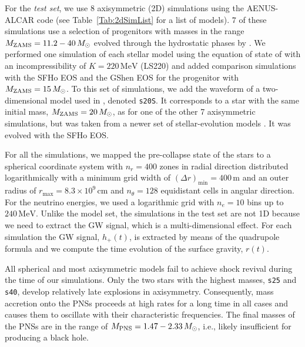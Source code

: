  
{For the {\it test set}, we use $8$ axisymmetric (2D) simulations using the {\sc AENUS-ALCAR} code
(see Table~\ref{Tab:2dSimList} for a list of models).
$7$ of these simulations use a selection of progenitors with masses in the range} $M_{\mathrm{ZAMS}} = 11.2 - 40 \, M_{\odot}$
 evolved through the hydrostatic phases by
\cite{Woosley_Heger_Weaver__2002__ReviewsofModernPhysics__The_evolution_and_explosion_of_massive_stars}.
We performed one simulation of each stellar model using the equation
of state of \cite{Lattimer_Swesty__1991__NuclearPhysicsA__LS-EOS} with
an incompressibility of $K = 220 \, \mathrm{MeV}$ (LS220) and added
comparison simulations with the SFHo EOS
\cite{Steiner_et_al__2013__apj__Core-collapseSupernovaEquationsofStateBasedonNeutronStarObservations}
and the GShen EOS 
\cite{Shen_et_al__2011__prc__Newequationofstateforastrophysicalsimulations}
for the {progenitor} with $M_{\mathrm{ZAMS}} = 15 \, M_{\odot}$. To this set of
simulations, we add the waveform of a two-dimensional model used in
\cite{Torres:2019a}, denoted \texttt{s20S}. It corresponds to a star
with the same initial mass, $M_{\mathrm{ZAMS}} = 20 \, M_{\odot}$, as for
one of the other 7 axisymmetric simulations, but was taken from a
newer set of stellar-evolution models
\cite{Woosley_Heger__2007__physrep__Nucleosynthesisandremnantsinmassivestarsofsolarmetallicity}.
It was evolved with the SFHo EOS.


{For all the simulations,} we mapped the pre-collapse state of the stars to a spherical
coordinate system with $n_r = 400$ zones in radial direction
distributed logarithmically with a minimum grid width of
$(\Delta r)_{\mathrm{min}} = 400 \, \mathrm{m}$ and an outer radius of
$r_{\mathrm{max}} = 8.3 \times 10^{9} \, \mathrm{cm}$ and
$n_{\theta} = 128$ equidistant cells in angular direction. For the
neutrino energies, we used a logarithmic grid with $n_e = 10$ bins up
to $240 \, \mathrm{MeV}$.
{Unlike the model set, the simulations in the test set are not 1D because we need to 
extract the GW signal, which is a multi-dimensional effect. For each simulation
the GW signal, $h_+(t)$, is extracted by means of the quadrupole formula and we compute the 
time evolution of the surface gravity, $r(t)$.}

All spherical and most axisymmetric models fail to achieve shock
revival during the time of our simulations. Only the two stars with
the highest masses, \texttt{s25} and \texttt{s40}, develop relatively
late explosions in axisymmetry. Consequently, mass accretion onto the
PNSs proceeds at high rates for a long time in all cases and causes
them to oscillate with their characteristic frequencies. The final
masses of the PNSs are in the range of
$M_{\mathrm{PNS}} = 1.47 - 2.33 \, M_{\odot}$, i.e., likely insufficient for
producing a black hole.


 	

